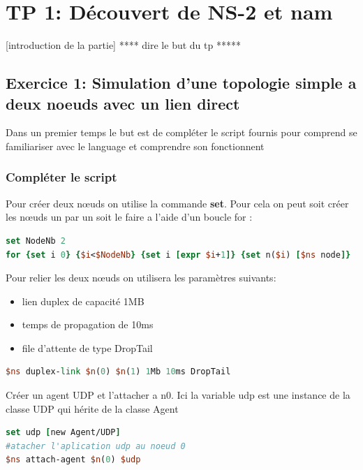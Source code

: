 \documentclass[11pt]{article}
\begin{document}
\section{TP 1: Découvert de NS-2 et nam}
[introduction de la partie] **** dire le but du tp  *****

\subsection{Exercice 1: Simulation d'une topologie simple a deux noeuds avec un lien direct}

Dans un premier temps le but est de compléter le script fournis pour comprend se familiariser avec le language et comprendre son fonctionnent

\subsubsection{Compléter le script}
Pour créer deux nœuds on utilise la commande \textbf{set}. Pour cela on peut soit créer les nœuds un par un soit le faire a l'aide d'un boucle for :

\begin{lstlisting}[language=tcl, numbers=none, framexleftmargin=0pt, framextopmargin=0pt, framexbottommargin=0pt]
set NodeNb 2
for {set i 0} {$i<$NodeNb} {set i [expr $i+1]} {set n($i) [$ns node]}
\end{lstlisting}

\noindent %
Pour relier les deux nœuds on utilisera les paramètres suivants:
\begin{itemize}
	\item lien duplex de capacité 1MB
	\item temps de propagation de 10ms
	\item file d'attente de type DropTail
\end{itemize}

\begin{lstlisting}[language=tcl, numbers=none, framexleftmargin=0pt, 	framextopmargin=0pt, framexbottommargin=0pt]
$ns duplex-link $n(0) $n(1) 1Mb 10ms DropTail
\end{lstlisting}


Créer un agent UDP et l'attacher a n0. Ici la variable udp est une instance de la classe UDP qui hérite de la classe Agent

\begin{lstlisting}[language=tcl, numbers=none, framexleftmargin=0pt, 	framextopmargin=0pt, framexbottommargin=0pt]
set udp [new Agent/UDP]
#atacher l'aplication udp au noeud 0
$ns attach-agent $n(0) $udp 
\end{lstlisting}
\end{document}
